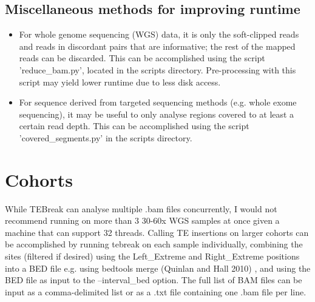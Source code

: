 \documentclass[letterpaper,11pt]{article}
\begin{document}
\subsection{Miscellaneous methods for improving runtime}
\begin{itemize}
\item For whole genome sequencing (WGS) data, it is only the soft-clipped reads and reads in discordant pairs that are informative; the rest of the mapped reads can be discarded. This can be accomplished using the script 'reduce\_bam.py', located in the scripts directory. Pre-processing with this script may yield lower runtime due to less disk access.
\item For sequence derived from targeted sequencing methods (e.g. whole exome sequencing), it may be useful to only analyse regions covered to at least a certain read depth. This can be accomplished using the script 'covered\_segments.py' in the scripts directory.
\end{itemize}

\section{Cohorts}
While TEBreak can analyse multiple .bam files concurrently, I would not recommend running on more than 3 30-60x WGS samples at once given a machine that can support 32 threads. Calling TE insertions on larger cohorts can be accomplished by running tebreak on each sample individually, combining the sites (filtered if desired) using the Left\_Extreme and Right\_Extreme positions into a BED file e.g. using bedtools merge (Quinlan and Hall 2010) , and using the BED file as input to the --interval\_bed option. The full list of BAM files can be input as a comma-delimited list or as a .txt file containing one .bam file per line.
\end{document}
